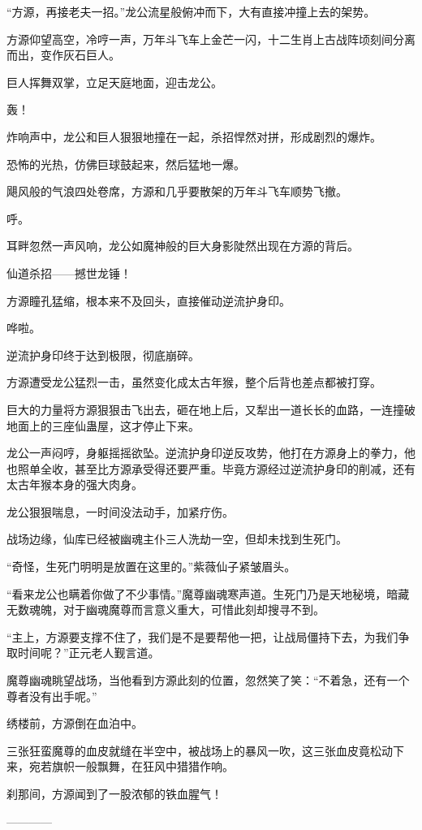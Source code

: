 \begin{this_body}
“方源，再接老夫一招。”龙公流星般俯冲而下，大有直接冲撞上去的架势。

方源仰望高空，冷哼一声，万年斗飞车上金芒一闪，十二生肖上古战阵顷刻间分离而出，变作灰石巨人。

巨人挥舞双掌，立足天庭地面，迎击龙公。

轰！

炸响声中，龙公和巨人狠狠地撞在一起，杀招悍然对拼，形成剧烈的爆炸。

恐怖的光热，仿佛巨球鼓起来，然后猛地一爆。

飓风般的气浪四处卷席，方源和几乎要散架的万年斗飞车顺势飞撤。

呼。

耳畔忽然一声风响，龙公如魔神般的巨大身影陡然出现在方源的背后。

仙道杀招——撼世龙锤！

方源瞳孔猛缩，根本来不及回头，直接催动逆流护身印。

哗啦。

逆流护身印终于达到极限，彻底崩碎。

方源遭受龙公猛烈一击，虽然变化成太古年猴，整个后背也差点都被打穿。

巨大的力量将方源狠狠击飞出去，砸在地上后，又犁出一道长长的血路，一连撞破地面上的三座仙蛊屋，这才停止下来。

龙公一声闷哼，身躯摇摇欲坠。逆流护身印逆反攻势，他打在方源身上的拳力，他也照单全收，甚至比方源承受得还要严重。毕竟方源经过逆流护身印的削减，还有太古年猴本身的强大肉身。

龙公狠狠喘息，一时间没法动手，加紧疗伤。

战场边缘，仙库已经被幽魂主仆三人洗劫一空，但却未找到生死门。

“奇怪，生死门明明是放置在这里的。”紫薇仙子紧皱眉头。

“看来龙公也瞒着你做了不少事情。”魔尊幽魂寒声道。生死门乃是天地秘境，暗藏无数魂魄，对于幽魂魔尊而言意义重大，可惜此刻却搜寻不到。

“主上，方源要支撑不住了，我们是不是要帮他一把，让战局僵持下去，为我们争取时间呢？”正元老人觐言道。

魔尊幽魂眺望战场，当他看到方源此刻的位置，忽然笑了笑：“不着急，还有一个尊者没有出手呢。”

绣楼前，方源倒在血泊中。

三张狂蛮魔尊的血皮就缝在半空中，被战场上的暴风一吹，这三张血皮竟松动下来，宛若旗帜一般飘舞，在狂风中猎猎作响。

刹那间，方源闻到了一股浓郁的铁血腥气！

------------

\end{this_body}

